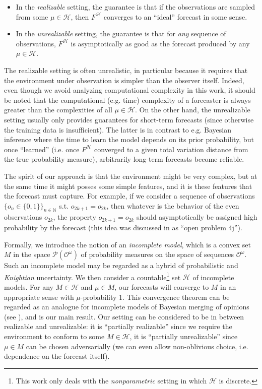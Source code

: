 \documentclass[11pt]{article}
\theoremstyle{definition}
\theoremstyle{plain}
\newcommand{\Nats}{\mathbb{N}}
\newcommand{\PM}{\mathcal{P}}
\newcommand{\Ob}{\mathcal{O}}
\newcommand{\OO}{\Ob^\omega}
\newcommand{\PMO}{\PM(\OO)}
\newcommand{\MC}{\mathcal{H}}
\begin{document}
\begin{itemize}
\item 
In the \emph{realizable} setting, the guarantee is that if the observations are sampled from some $\mu \in \MC$, then $F^\MC$ converges to an \enquote{ideal} forecast in some sense.
\item
In the \emph{unrealizable} setting, the guarantee is that for \emph{any} sequence of observations, $F^\MC$ is asymptotically as good as the forecast produced by any $\mu \in \MC$.
\end{itemize}

The realizable setting is often unrealistic, in particular because it requires that the environment under observation is simpler than the observer itself. Indeed, even though we avoid analyzing computational complexity in this work, it should be noted that the computational (e.g. time) complexity of a forecaster is always greater than the complexities of all $\mu \in \MC$. On the other hand, the unrealizable setting usually only provides guarantees for short-term forecasts (since otherwise the training data is insufficient). The latter is in contrast to e.g. Bayesian inference where the time to learn the model depends on its prior probability, but once \enquote{learned} (i.e. once $F^\MC$ converged to a given total variation distance from the true probability measure), arbitrarily long-term forecasts become reliable.

The spirit of our approach is that the environment might be very complex, but at the same time it might posses some simple features, and it is these features that the forecast must capture. For example, if we consider a sequence of observations $\{o_n \in \{0,1\}\}_{n \in \Nats}$ s.t. $o_{2k+1}=o_{2k}$, then whatever is the behavior of the even observations $o_{2k}$, the property $o_{2k+1}=o_{2k}$ should asymptotically be assigned high probability by the forecast (this idea was discussed in \cite{Hutter_2009} as \enquote{open problem 4j}).

Formally, we introduce the notion of an \emph{incomplete model}, which is a convex set $M$ in the space $\PMO$ of probability measures on the space of sequences $\OO$. Such an incomplete model may be regarded as a hybrid of probabilistic and \emph{Knightian} uncertainty. We then consider a countable\footnote{This work only deals with the \emph{nonparametric} setting in which $\MC$ is discrete.} set $\MC$ of incomplete models. For any $M \in \MC$ and $\mu \in M$, our forecasts will converge to $M$ in an appropriate sense with $\mu$-probability 1. This convergence theorem can be regarded as an analogue for incomplete models of Bayesian merging of opinions (see \cite{Blackwell_1962}), and is our main result. Our setting can be considered to be in between realizable and unrealizable: it is \enquote{partially realizable} since we require the environment to conform to some $M \in \MC$, it is \enquote{partially unrealizable} since $\mu \in M$ can be chosen adversarially (we can even allow non-oblivious choice, i.e. dependence on the forecast itself).
\end{document}
